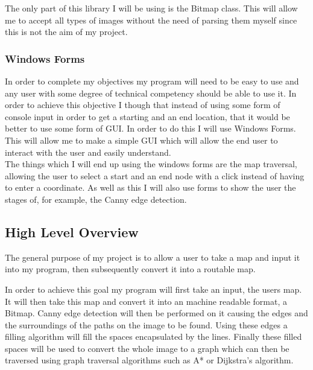 \begin{FlushLeft}
    The only part of this library I will be using is the Bitmap class. This will allow me to accept all types of images without the need of parsing them myself since this is not the aim of my project. 
    \\ \bk

    \subsubsection{Windows Forms}
    In order to complete my objectives my program will need to be easy to use and any user with some degree of technical competency should be able to use it. In order to achieve this objective I though that instead of using some form of console input in order to get a starting and an end location, that it would be better to use some form of GUI. In order to do this I will use Windows Forms. This will allow me to make a simple GUI which will allow the end user to interact with the user and easily understand. \\ 

    The things which I will end up using the windows forms are the map traversal, allowing the user to select a start and an end node with a click instead of having to enter a coordinate. As well as this I will also use forms to show the user the stages of, for example, the Canny edge detection.
    \\ \bk

    \subsection{High Level Overview}
    The general purpose of my project is to allow a user to take a map and input it into my program, then subsequently convert it into a routable map. \\ \bk
    
    In order to achieve this goal my program will first take an input, the users map. It will then take this map and convert it into an machine readable format, a Bitmap. Canny edge detection will then be performed on it causing the edges and the surroundings of the paths on the image to be found. Using these edges a filling algorithm will fill the spaces encapsulated by the lines. Finally these filled spaces will be used to convert the whole image to a graph which can then be traversed using graph traversal algorithms such as A* or Dijkstra's algorithm. \\ \bk


\end{FlushLeft}
